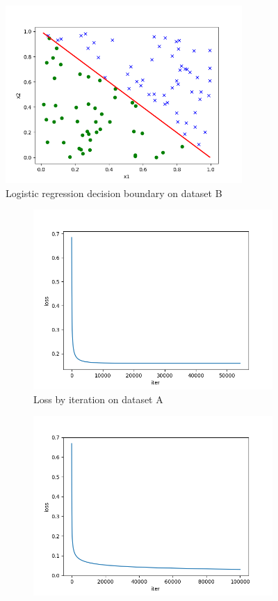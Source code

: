 \begin{answer}
\begin{figure}[H]
    \centering
    \includegraphics[width=9cm]{logreg_stability/logreg_pred_b.png}
    \caption*{Logistic regression decision boundary on dataset B}
\end{figure}
\begin{figure}[H]
  \centering
  \begin{subfigure}[b]{0.49\textwidth}
    \includegraphics[width=\textwidth]{logreg_stability/logreg_pred_a_loss.png}
    \caption*{Loss by iteration on dataset A}
  \end{subfigure}
  \begin{subfigure}[b]{0.49\textwidth}
    \includegraphics[width=\textwidth]{logreg_stability/logreg_pred_b_loss.png}

\end{subfigure}
\end{figure}
\end{answer}
